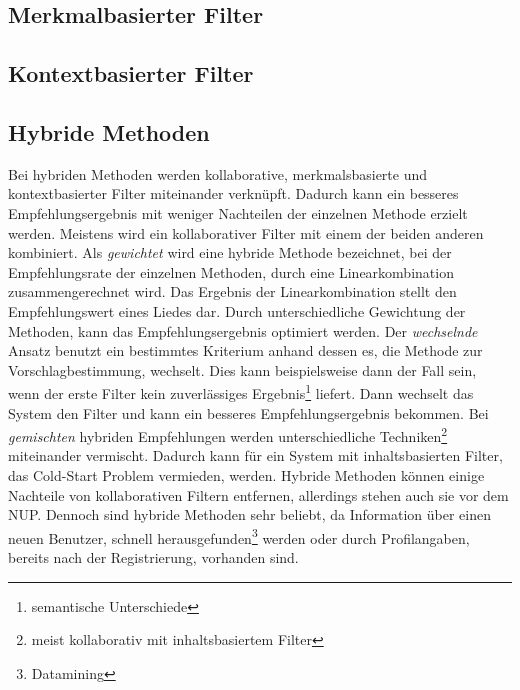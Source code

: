 \documentclass[twosided,a4,10pt]{article}
\begin{document}
\begin{multicols}{2}
		\subsection{Merkmalbasierter Filter}
		\subsection{Kontextbasierter Filter}				
		\subsection{Hybride Methoden}
		Bei hybriden Methoden werden kollaborative, merkmalsbasierte und kontextbasierter Filter miteinander verknüpft. Dadurch kann ein besseres Empfehlungsergebnis mit weniger Nachteilen der einzelnen Methode erzielt werden. Meistens wird ein kollaborativer Filter mit einem der beiden anderen kombiniert.\newline
		Als \textit{gewichtet} wird eine hybride Methode bezeichnet, bei der Empfehlungsrate der einzelnen Methoden, durch eine Linearkombination zusammengerechnet wird. Das Ergebnis der Linearkombination stellt den Empfehlungswert eines Liedes dar. Durch unterschiedliche Gewichtung der Methoden, kann das Empfehlungsergebnis optimiert werden. Der \textit{wechselnde} Ansatz benutzt ein bestimmtes Kriterium anhand dessen es, die Methode zur Vorschlagbestimmung, wechselt. Dies kann beispielsweise dann der Fall sein, wenn der erste Filter kein zuverlässiges Ergebnis\footnote[6]{semantische Unterschiede} liefert. Dann wechselt das System den Filter und kann ein besseres Empfehlungsergebnis bekommen. Bei \textit{gemischten} hybriden Empfehlungen werden unterschiedliche Techniken\footnote[7]{meist kollaborativ mit inhaltsbasiertem Filter} miteinander vermischt. Dadurch kann für ein System mit inhaltsbasierten Filter, das Cold-Start Problem vermieden, werden.\newline
		Hybride Methoden können einige Nachteile von kollaborativen Filtern entfernen, allerdings stehen auch sie vor dem NUP. Dennoch sind hybride Methoden sehr beliebt, da Information über einen neuen Benutzer, schnell herausgefunden\footnote[8]{Datamining} werden oder durch Profilangaben, bereits nach der Registrierung, vorhanden sind. \cite{burke}

\end{multicols}
\end{document}
